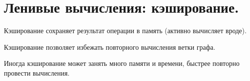 \section{Ленивые вычисления: кэширование.}

Кэширование сохраняет результат операции в память (активно вычисляет вроде).

Кэширование позволяет избежать повторного вычисления ветки графа.

Иногда кэширование может занять много памяти и времени, быстрее
повторно провести вычисления.
